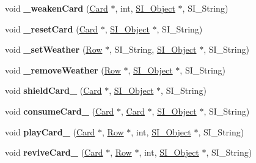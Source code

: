 \begin{DoxyCompactItemize}
\item 
\mbox{\label{class_field_ab617d82c4f6bff280c4167a7b92d9086}} 
void {\bfseries \+\_\+weaken\+Card} (\hyperlink{class_card}{Card} $\ast$, int, \hyperlink{class_s_i___object}{S\+I\+\_\+\+Object} $\ast$, S\+I\+\_\+\+String)
\item 
\mbox{\label{class_field_a3477ee3089ec974ebe113eeac70f072f}} 
void {\bfseries \+\_\+reset\+Card} (\hyperlink{class_card}{Card} $\ast$, \hyperlink{class_s_i___object}{S\+I\+\_\+\+Object} $\ast$, S\+I\+\_\+\+String)
\item 
\mbox{\label{class_field_ab5c8b6dd6677c9429b169ef6a587ffde}} 
void {\bfseries \+\_\+set\+Weather} (\hyperlink{class_card_set}{Row} $\ast$, S\+I\+\_\+\+String, \hyperlink{class_s_i___object}{S\+I\+\_\+\+Object} $\ast$, S\+I\+\_\+\+String)
\item 
\mbox{\label{class_field_a5edf42124c15d414c713dce172e171fe}} 
void {\bfseries \+\_\+remove\+Weather} (\hyperlink{class_card_set}{Row} $\ast$, \hyperlink{class_s_i___object}{S\+I\+\_\+\+Object} $\ast$, S\+I\+\_\+\+String)
\item 
\mbox{\label{class_field_ae8eb2c6fcaf49881dfd88a1f8acc4c1a}} 
void {\bfseries shield\+Card\+\_\+} (\hyperlink{class_card}{Card} $\ast$, \hyperlink{class_s_i___object}{S\+I\+\_\+\+Object} $\ast$, S\+I\+\_\+\+String)
\item 
\mbox{\label{class_field_af2b18af1d67f7f37ce6b59fa49395368}} 
void {\bfseries consume\+Card\+\_\+} (\hyperlink{class_card}{Card} $\ast$, \hyperlink{class_card}{Card} $\ast$, \hyperlink{class_s_i___object}{S\+I\+\_\+\+Object} $\ast$, S\+I\+\_\+\+String)
\item 
\mbox{\label{class_field_a3517ba57b0ae917d937674eb9214e8ae}} 
void {\bfseries play\+Card\+\_\+} (\hyperlink{class_card}{Card} $\ast$, \hyperlink{class_card_set}{Row} $\ast$, int, \hyperlink{class_s_i___object}{S\+I\+\_\+\+Object} $\ast$, S\+I\+\_\+\+String)
\item 
\mbox{\label{class_field_aad8669fad3788a8daecd0a496f7e21d8}} 
void {\bfseries revive\+Card\+\_\+} (\hyperlink{class_card}{Card} $\ast$, \hyperlink{class_card_set}{Row} $\ast$, int, \hyperlink{class_s_i___object}{S\+I\+\_\+\+Object} $\ast$, S\+I\+\_\+\+String)

\end{DoxyCompactItemize}
